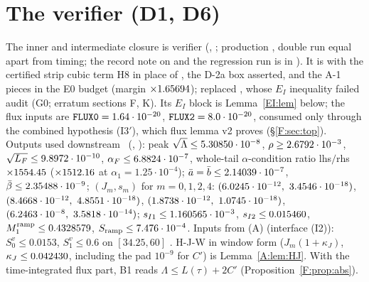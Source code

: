 \documentclass[11pt]{article}
\begin{document}
\section{The verifier (D1, D6)}\label{M:sec:verifier}
The inner and intermediate closure is verifier  (, ; production , double run equal apart from timing; the record note on  and the regression run is in ). It is  with the certified strip cubic term H8 in place of , the D-2a box asserted, and the A-1 pieces in the E0 budget (margin $\times1.65694$);  replaced , whose $E_I$ inequality failed audit (G0; erratum sections F, K). Its $E_I$ block is Lemma~\ref{EI:lem} below; the flux inputs are $\fn{FLUX0}=1.64\cdot10^{-20}$, $\fn{FLUX2}=8.0\cdot10^{-20}$, consumed only through the combined hypothesis (I3$'$), which flux lemma v2 proves (\S\ref{F:sec:top}). Outputs used downstream \tC\ (, ): peak $\sqrt\Lambda\le5.30850\cdot10^{-8}$, $\rho\ge2.6792\cdot10^{-3}$, $\sqrt{L_F}\le9.8972\cdot10^{-10}$, $\alpha_F\le6.8824\cdot10^{-7}$, whole-tail $\alpha$-condition ratio lhs$/$rhs $\times1554.45$ ($\times1512.16$ at $\alpha_1=1.25\cdot10^{-4}$); $\bar a=\bar b\le2.14039\cdot10^{-7}$, $\bar\beta\le2.35488\cdot10^{-9}$; $(J_m,s_m)$ for $m=0,1,2,4$: $(6.0245\cdot10^{-12},\ 3.4546\cdot10^{-18})$, $(8.4668\cdot10^{-12},\ 4.8551\cdot10^{-18})$, $(1.8738\cdot10^{-12},\ 1.0745\cdot10^{-18})$, $(6.2463\cdot10^{-8},\ 3.5818\cdot10^{-14})$; $s_{I1}\le1.160565\cdot10^{-3}$, $s_{I2}\le0.015460$, $M_1^{\rm ramp}\le0.4328579$, $S_{\rm ramp}\le7.476\cdot10^{-4}$. Inputs from (A) (interface (I2)): $S^v_0\le0.0153$, $S^v_1\le0.6$ on $[34.25,60]$ \tB. H-J-W in window form ($J_m(1+\kappa_J)$, $\kappa_J\le0.042430$, including the pad $10^{-9}$ for $C'$) is Lemma~\ref{A:lem:HJ}. With the time-integrated flux part, B1 reads $\Lambda\le L(\tau)+2C'$ (Proposition~\ref{F:prop:abs}).







\end{document}
